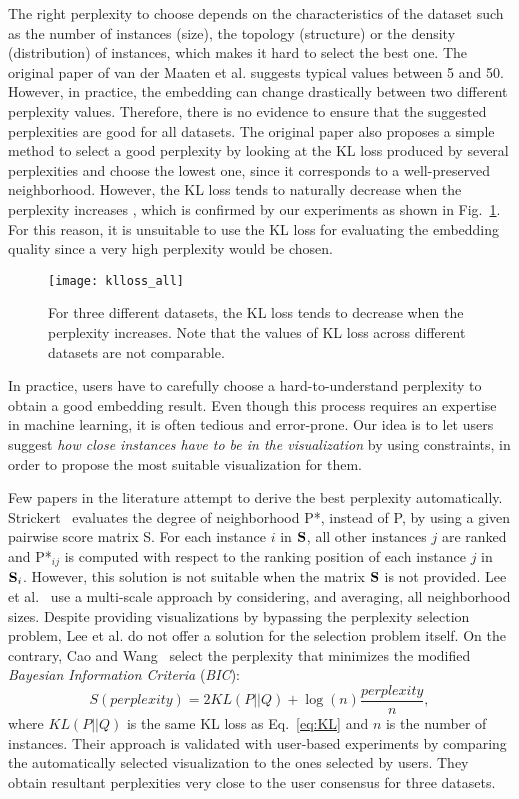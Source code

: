 The right perplexity to choose depends on the characteristics of the dataset such as the number of instances (size), the topology (structure) or the density (distribution) of instances, which makes it hard to select the best one.
The original paper of van der Maaten et al. \cite{maaten2008tsne} suggests typical values between 5 and 50.
However, in practice, the embedding can change drastically between two different perplexity values. Therefore, there is no evidence to ensure that the suggested perplexities are good for all datasets.
The original paper also proposes a simple method to select a good perplexity by looking at the KL loss produced by several perplexities and choose the lowest one, since it corresponds to a well-preserved neighborhood.
However, the KL loss tends to naturally decrease when the perplexity increases \cite{cao2017automatic}, which  is confirmed by our experiments as shown in Fig.~\ref{fig:klloss}. For this reason, it is unsuitable to use the KL loss for evaluating the embedding quality since a very high perplexity would be chosen.

\begin{figure}
    \centering
    \texttt{[image: klloss\_all]}
    \caption{For three different datasets, the KL loss tends to decrease when the perplexity increases. Note that the values of KL loss across different datasets are not comparable.}
    \label{fig:klloss}
\end{figure}

In practice, users have to carefully choose a hard-to-understand perplexity to obtain a good embedding result.
Even though this process requires an expertise in machine learning, it is often tedious and error-prone.
Our idea is to let users suggest \emph{how close instances have to be in the visualization} by using constraints, in order to propose the most suitable visualization for them.

Few papers in the literature attempt to derive the best perplexity automatically.
Strickert~\cite{strickert2012} evaluates the degree of neighborhood P*, instead of P, by using a given pairwise score matrix S. For each instance $i$ in ${\bf S}$, all other instances $j$ are ranked and {P*}$_{ij}$ is computed with respect to the ranking position of each instance $j$ in ${\bf S}_i$. However, this solution is not suitable when the matrix ${\bf S}$ is not provided.
Lee et al.~\cite{lee2014} use a multi-scale approach by considering, and averaging, all neighborhood sizes. Despite providing visualizations by bypassing the perplexity selection problem, Lee et al. do not offer a solution for the selection problem itself.
On the contrary, Cao and Wang~\cite{cao2017automatic} select the perplexity that minimizes the modified \emph{Bayesian Information Criteria} (\emph{BIC}):
\begin{equation}
S(\textit{perplexity}) = 2KL(P||Q) + \log(n)\frac{\textit{perplexity}}{n},
\end{equation}
where $KL(P||Q)$ is the same KL loss as Eq.~\ref{eq:KL} and $n$ is the number of instances.
Their approach is validated with user-based experiments by comparing the automatically selected visualization to the ones selected by users. They obtain resultant perplexities very close to the user consensus for three datasets.


